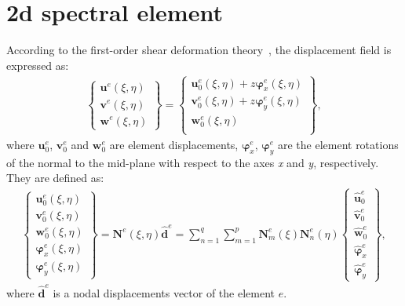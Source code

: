 \section{\acs{2d} spectral element}
\label{sec:2Dmodel}


According to the first-order shear deformation theory~\cite{reissner1945effect, mindlin1951influence}, the displacement field is expressed as:
\begin{eqnarray}
	\left \{ \begin{array}{c}
		\textbf{u}^e(\xi,\eta) \\
		\textbf{v}^e(\xi,\eta) \\
		\textbf{w}^e(\xi,\eta)
	\end{array} \right\} = 
	\left \{ \begin{array}{c}
		\textbf{u}_0^e(\xi,\eta) + z\boldsymbol{\varphi}_x^e(\xi,\eta)\\
		\textbf{v}_0^e(\xi,\eta) + z\boldsymbol{\varphi}_y^e(\xi,\eta)\\
		\textbf{w}_0^e(\xi,\eta) \\
	\end{array} \right\},
\end{eqnarray}
%
%
where \(\textbf{u}_0^e\), \(\textbf{v}_0^e\) and \(\textbf{w}_0^e\) are element displacements, \(\boldsymbol{\varphi}_x^e\), \(\boldsymbol{\varphi}_y^e\) are the element rotations of the normal to the mid-plane with respect to the axes \textit{x} and \textit{y}, respectively. They are defined as:
\begin{eqnarray}
	\left \{\begin{array}{c}
		\textbf{u}_0^e(\xi,\eta) \\
		\textbf{v}_0^e(\xi,\eta) \\
		\textbf{w}_0^e(\xi,\eta) \\
		\boldsymbol{\varphi}_x^e(\xi,\eta) \\
		\boldsymbol{\varphi}_y^e(\xi,\eta)
	\end{array} \right\}
	= \textbf{N}^e(\xi,\eta)\widehat{\textbf{d}}^e
	= \sum_{n=1}^q\sum_{m=1}^p\textbf{N}_m^e(\xi)\textbf{N}_n^e(\eta)
	\left \{ \begin{array}{c}
		\widehat{\textbf{u}}_0^e \\
		\widehat{\textbf{v}}_0^e \\
		\widehat{\textbf{w}}_0^e \\
		\widehat{\boldsymbol{\varphi}}_x^e \\
		\widehat{\boldsymbol{\varphi}}_y^e
	\end{array} \right \},
\end{eqnarray}
where $\widehat{\textbf{d}}^e$ is a nodal displacements vector of the element $e$.

